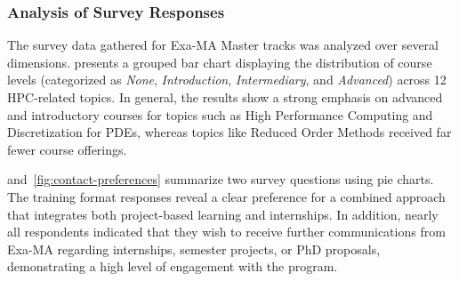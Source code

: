\subsubsection{Analysis of Survey Responses}

The survey data gathered for Exa-MA Master tracks was analyzed over several dimensions. 
 presents a grouped bar chart displaying the distribution of course levels (categorized as \emph{None}, \emph{Introduction}, \emph{Intermediary}, and \emph{Advanced}) across 12 HPC-related topics. In general, the results show a strong emphasis on advanced and introductory courses for topics such as High Performance Computing and Discretization for PDEs, whereas topics like Reduced Order Methods received far fewer course offerings.

 and~\cref{fig:contact-preferences} summarize two survey questions using pie charts. 
The training format responses reveal a clear preference for a combined approach that integrates both project-based learning and internships. 
In addition, nearly all respondents indicated that they wish to receive further communications from Exa-MA regarding internships, semester projects, or PhD proposals, demonstrating a high level of engagement with the program.

\bigskip

